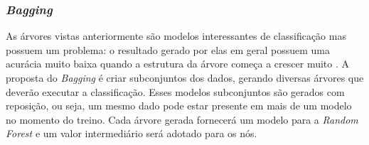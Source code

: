 \subsubsection{\emph{Bagging}}

As árvores vistas anteriormente são modelos interessantes de classificação mas possuem um problema: o resultado gerado por elas em geral possuem uma acurácia muito baixa quando a estrutura da árvore começa a crescer muito \cite[p. 312]{HASTIE}.
A proposta do \emph{Bagging} é criar subconjuntos dos dados, gerando diversas árvores que deverão executar a classificação. Esses modelos subconjuntos são gerados com reposição, ou seja, um mesmo dado pode estar presente em mais de um modelo no momento do treino. Cada árvore gerada fornecerá um modelo para a \emph{Random Forest} e um valor intermediário será adotado para os nós. 

